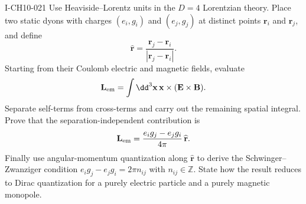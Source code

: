 \begin{exercise}{I-CH10-021}
Use Heaviside--Lorentz units in the $D=4$ Lorentzian theory.  Place two static
dyons with charges
$(e_i,g_i)$ and $(e_j,g_j)$ at distinct points $\mathbf r_i$ and
$\mathbf r_j$, and define
\[
  \widehat{\mathbf r}=
  \frac{\mathbf r_j-\mathbf r_i}{|\mathbf r_j-\mathbf r_i|}.
\]
Starting from their Coulomb electric and magnetic fields, evaluate
\[
  \mathbf L_{\rm em}=\int\dd^3\mathbf x\,
  \mathbf x\times(\mathbf E\times\mathbf B).
\]
Separate self-terms from cross-terms and carry out the remaining spatial
integral.  Prove that the separation-independent contribution is
\[
  \mathbf L_{\rm em}=
  \frac{e_i g_j-e_j g_i}{4\pi}\,\widehat{\mathbf r}.
\]
Finally use angular-momentum quantization along
$\widehat{\mathbf r}$ to derive the Schwinger--Zwanziger condition
$e_i g_j-e_jg_i=2\pi n_{ij}$ with $n_{ij}\in\mathbb Z$.  State how the result
reduces to Dirac quantization for a purely electric particle and a purely
magnetic monopole.
\end{exercise}
